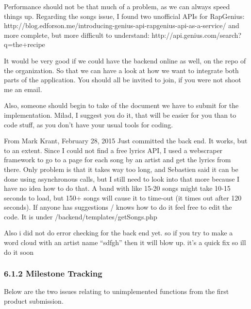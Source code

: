 \documentclass[]{article}
\begin{document}
Performance should not be that much of a problem, as we can always speed
things up. Regarding the songs issue, I found two unofficial APIs for
RapGenius:
http://blog.edforson.me/introducing-genius-api-rapgenius-api-as-a-service/
and more complete, but more difficult to understand:
http://api.genius.com/search?q=the+recipe

It would be very good if we could have the backend online as well, on
the repo of the organization. So that we can have a look at how we want
to integrate both parts of the application. You should all be invited to
join, if you were not shoot me an email.

Also, someone should begin to take of the document we have to submit for
the implementation. Milad, I suggest you do it, that will be easier for
you than to code stuff, as you don't have your usual tools for coding.

From Mark Krant, February 28, 2015 Just committed the back end. It
works, but to an extent. Since I could not find a free lyrics API, I
used a webscraper framework to go to a page for each song by an artist
and get the lyrics from there. Only problem is that it takes way too
long, and Sebastien said it can be done using asynchronous calls, but I
still need to look into that more because I have no idea how to do that.
A band with like 15-20 songs might take 10-15 seconds to load, but 150+
songs will cause it to time-out (it times out after 120 seconds). If
anyone has suggestions / knows how to do it feel free to edit the code.
It is under /backend/templates/getSongs.php

Also i did not do error checking for the back end yet. so if you try to
make a word cloud with an artist name ``sdfgh'' then it will blow up.
it's a quick fix so ill do it soon

\subsubsection{\textbf{6.1.2 Milestone
Tracking}}\label{milestone-tracking}

Below are the two issues relating to unimplemented functions from the
first product submission.
\end{document}
